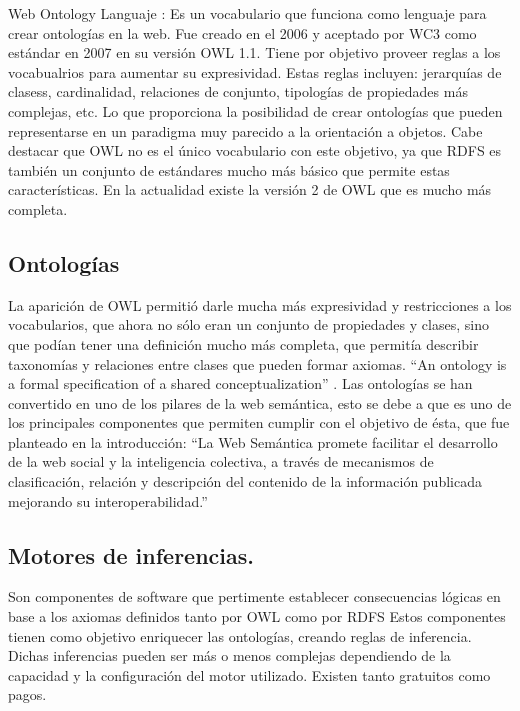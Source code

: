 Web Ontology Languaje \cite{McGuinness2004}: Es un vocabulario que funciona como lenguaje para crear ontologías en la web. Fue creado en el 2006 y aceptado 
por WC3 como estándar en 2007 en su versión OWL 1.1. Tiene por objetivo proveer reglas a los vocabualrios para aumentar su expresividad. 
Estas reglas incluyen: jerarquías de clasess, cardinalidad, relaciones de conjunto, tipologías de propiedades más complejas, etc. Lo que proporciona la posibilidad de crear ontologías que pueden 
representarse en un paradigma muy parecido a la orientación a objetos. Cabe destacar que OWL no es el único vocabulario con este objetivo, ya que RDFS 
es también un conjunto de estándares mucho más básico que permite estas características.
En la actualidad existe la versión 2 de OWL \cite{W3C} que es mucho más completa.

\subsection{Ontologías}

La aparición de OWL permitió darle mucha más expresividad y restricciones a los vocabularios, que ahora no sólo eran un conjunto de 
propiedades y clases, sino que podían tener una definición mucho más completa, que permitía describir taxonomías y relaciones entre clases que pueden formar axiomas.
``An ontology is a formal specification of a shared conceptualization'' \cite{Gruber1993} .
Las ontologías se han convertido en uno de los pilares de la web semántica, esto se debe a que es uno de los principales componentes que permiten 
cumplir con el objetivo de ésta, que fue planteado en la introducción: ``La Web Semántica promete facilitar el desarrollo de la web social y la inteligencia colectiva, a través de mecanismos de clasificación, relación y descripción del contenido de la información publicada mejorando su interoperabilidad.''

\subsection{Motores de inferencias.}

Son componentes de software que pertimente establecer consecuencias lógicas en base a los axiomas definidos tanto por OWL como por RDFS \cite{C.Trim}
Estos componentes tienen como objetivo enriquecer las ontologías, creando reglas de inferencia. 
Dichas inferencias pueden ser más o menos complejas dependiendo de la capacidad y la configuración del motor utilizado. Existen tanto gratuitos 
como pagos.


